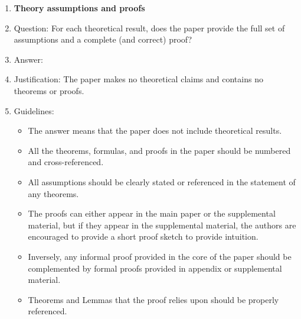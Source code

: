 \begin{enumerate}
\item {\bf Theory assumptions and proofs}
    \item[] Question: For each theoretical result, does the paper provide the full set of assumptions and a complete (and correct) proof?
    \item[] Answer: \answerNA{}
    \item[] Justification: The paper makes no theoretical claims and contains no theorems or proofs.
    \item[] Guidelines:
    \begin{itemize}
        \item The answer \answerNA{} means that the paper does not include theoretical results.
        \item All the theorems, formulas, and proofs in the paper should be numbered and cross-referenced.
        \item All assumptions should be clearly stated or referenced in the statement of any theorems.
        \item The proofs can either appear in the main paper or the supplemental material, but if they appear in the supplemental material, the authors are encouraged to provide a short proof sketch to provide intuition.
        \item Inversely, any informal proof provided in the core of the paper should be complemented by formal proofs provided in appendix or supplemental material.
        \item Theorems and Lemmas that the proof relies upon should be properly referenced.
    \end{itemize}


\end{enumerate}
